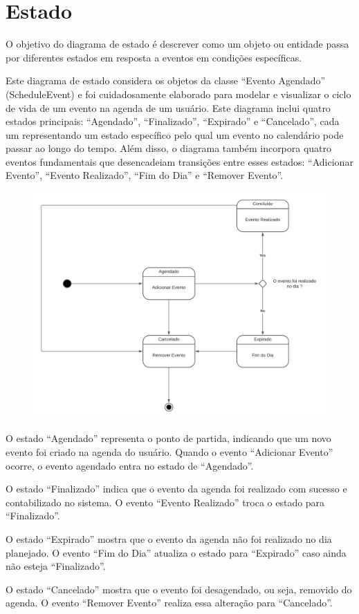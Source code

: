 \chapter{Estado}

O objetivo do diagrama de estado é descrever como um objeto ou entidade passa por
diferentes estados em resposta a eventos em condições específicas.

Este diagrama de estado considera os objetos da classe ``Evento Agendado''
(ScheduleEvent) e foi cuidadosamente elaborado para modelar e visualizar o ciclo
de vida de um evento na agenda de um usuário. Este diagrama inclui quatro estados
principais: ``Agendado'', ``Finalizado'', ``Expirado'' e ``Cancelado'', cada um
representando um estado específico pelo qual um evento no calendário pode passar
ao longo do tempo. Além disso, o diagrama também incorpora quatro eventos
fundamentais que desencadeiam transições entre esses estados: ``Adicionar Evento'',
``Evento Realizado'', ``Fim do Dia'' e ``Remover Evento''.

\begin{figure}[h]
  \centering
  \includegraphics[scale=0.5]{images/diagrams/state.png}
\end{figure}

O estado ``Agendado'' representa o ponto de partida, indicando que um novo evento
foi criado na agenda do usuário. Quando o evento ``Adicionar Evento'' ocorre, o
evento agendado entra no estado de ``Agendado''.

O estado ``Finalizado'' indica que o evento da agenda foi realizado com sucesso e
contabilizado no sistema. O evento ``Evento Realizado'' troca o estado para ``Finalizado''.

O estado ``Expirado'' mostra que o evento da agenda não foi realizado no dia planejado.
O evento ``Fim do Dia'' atualiza o estado para ``Expirado'' caso ainda não esteja
``Finalizado''.

O estado ``Cancelado'' mostra que o evento foi desagendado, ou seja, removido do
agenda. O evento ``Remover Evento'' realiza essa alteração para ``Cancelado''.
